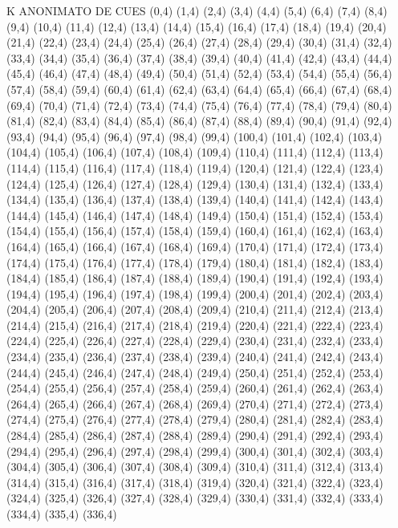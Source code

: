 K ANONIMATO DE CUES
(0,4)
(1,4)
(2,4)
(3,4)
(4,4)
(5,4)
(6,4)
(7,4)
(8,4)
(9,4)
(10,4)
(11,4)
(12,4)
(13,4)
(14,4)
(15,4)
(16,4)
(17,4)
(18,4)
(19,4)
(20,4)
(21,4)
(22,4)
(23,4)
(24,4)
(25,4)
(26,4)
(27,4)
(28,4)
(29,4)
(30,4)
(31,4)
(32,4)
(33,4)
(34,4)
(35,4)
(36,4)
(37,4)
(38,4)
(39,4)
(40,4)
(41,4)
(42,4)
(43,4)
(44,4)
(45,4)
(46,4)
(47,4)
(48,4)
(49,4)
(50,4)
(51,4)
(52,4)
(53,4)
(54,4)
(55,4)
(56,4)
(57,4)
(58,4)
(59,4)
(60,4)
(61,4)
(62,4)
(63,4)
(64,4)
(65,4)
(66,4)
(67,4)
(68,4)
(69,4)
(70,4)
(71,4)
(72,4)
(73,4)
(74,4)
(75,4)
(76,4)
(77,4)
(78,4)
(79,4)
(80,4)
(81,4)
(82,4)
(83,4)
(84,4)
(85,4)
(86,4)
(87,4)
(88,4)
(89,4)
(90,4)
(91,4)
(92,4)
(93,4)
(94,4)
(95,4)
(96,4)
(97,4)
(98,4)
(99,4)
(100,4)
(101,4)
(102,4)
(103,4)
(104,4)
(105,4)
(106,4)
(107,4)
(108,4)
(109,4)
(110,4)
(111,4)
(112,4)
(113,4)
(114,4)
(115,4)
(116,4)
(117,4)
(118,4)
(119,4)
(120,4)
(121,4)
(122,4)
(123,4)
(124,4)
(125,4)
(126,4)
(127,4)
(128,4)
(129,4)
(130,4)
(131,4)
(132,4)
(133,4)
(134,4)
(135,4)
(136,4)
(137,4)
(138,4)
(139,4)
(140,4)
(141,4)
(142,4)
(143,4)
(144,4)
(145,4)
(146,4)
(147,4)
(148,4)
(149,4)
(150,4)
(151,4)
(152,4)
(153,4)
(154,4)
(155,4)
(156,4)
(157,4)
(158,4)
(159,4)
(160,4)
(161,4)
(162,4)
(163,4)
(164,4)
(165,4)
(166,4)
(167,4)
(168,4)
(169,4)
(170,4)
(171,4)
(172,4)
(173,4)
(174,4)
(175,4)
(176,4)
(177,4)
(178,4)
(179,4)
(180,4)
(181,4)
(182,4)
(183,4)
(184,4)
(185,4)
(186,4)
(187,4)
(188,4)
(189,4)
(190,4)
(191,4)
(192,4)
(193,4)
(194,4)
(195,4)
(196,4)
(197,4)
(198,4)
(199,4)
(200,4)
(201,4)
(202,4)
(203,4)
(204,4)
(205,4)
(206,4)
(207,4)
(208,4)
(209,4)
(210,4)
(211,4)
(212,4)
(213,4)
(214,4)
(215,4)
(216,4)
(217,4)
(218,4)
(219,4)
(220,4)
(221,4)
(222,4)
(223,4)
(224,4)
(225,4)
(226,4)
(227,4)
(228,4)
(229,4)
(230,4)
(231,4)
(232,4)
(233,4)
(234,4)
(235,4)
(236,4)
(237,4)
(238,4)
(239,4)
(240,4)
(241,4)
(242,4)
(243,4)
(244,4)
(245,4)
(246,4)
(247,4)
(248,4)
(249,4)
(250,4)
(251,4)
(252,4)
(253,4)
(254,4)
(255,4)
(256,4)
(257,4)
(258,4)
(259,4)
(260,4)
(261,4)
(262,4)
(263,4)
(264,4)
(265,4)
(266,4)
(267,4)
(268,4)
(269,4)
(270,4)
(271,4)
(272,4)
(273,4)
(274,4)
(275,4)
(276,4)
(277,4)
(278,4)
(279,4)
(280,4)
(281,4)
(282,4)
(283,4)
(284,4)
(285,4)
(286,4)
(287,4)
(288,4)
(289,4)
(290,4)
(291,4)
(292,4)
(293,4)
(294,4)
(295,4)
(296,4)
(297,4)
(298,4)
(299,4)
(300,4)
(301,4)
(302,4)
(303,4)
(304,4)
(305,4)
(306,4)
(307,4)
(308,4)
(309,4)
(310,4)
(311,4)
(312,4)
(313,4)
(314,4)
(315,4)
(316,4)
(317,4)
(318,4)
(319,4)
(320,4)
(321,4)
(322,4)
(323,4)
(324,4)
(325,4)
(326,4)
(327,4)
(328,4)
(329,4)
(330,4)
(331,4)
(332,4)
(333,4)
(334,4)
(335,4)
(336,4)
